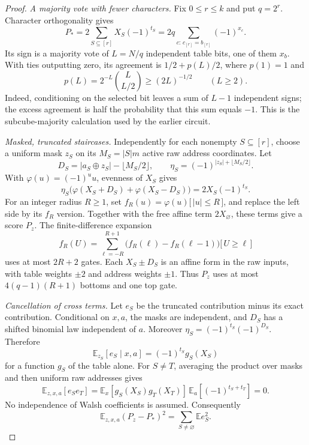 \documentclass[11pt,letterpaper]{article}
\theoremstyle{remark}
\newcommand{\ind}[1]{\bigl[\,#1\,\bigr]}
\begin{document}
\begin{proof}
\emph{A majority vote with fewer characters.}
Fix $0\le r\le k$ and put $q=2^r$. Character orthogonality gives
\[
P_*=2\sum_{S\subseteq[r]}X_S(-1)^{t_S}
 =2q\sum_{c:\,c_{[r]}=b_{[r]}}(-1)^{x_c}.
\]
Its sign is a majority vote of $L=N/q$ independent table bits, one of them
$x_b$. With ties outputting zero, its agreement is
$1/2+p(L)/2$, where $p(1)=1$ and
\[
p(L)=2^{-L}\binom{L}{L/2}\ge(2L)^{-1/2}\qquad(L\ge2).
\]
Indeed, conditioning on the selected bit leaves a sum of $L-1$ independent
signs; the excess agreement is half the probability that this sum equals
$-1$. This is the subcube-majority calculation used by the earlier circuit.

\emph{Masked, truncated staircases.}
Independently for each nonempty $S\subseteq[r]$, choose a uniform mask $z_S$
on its $M_S=|S|m$ active raw address coordinates. Let
\[
D_S=|a_S\oplus z_S|-\lfloor M_S/2\rfloor,\qquad
\eta_S=(-1)^{|z_S|+\lfloor M_S/2\rfloor}.
\]
With $\varphi(u)=(-1)^u u$, evenness of $X_S$ gives
\[
\eta_S\bigl(\varphi(X_S+D_S)+\varphi(X_S-D_S)\bigr)
 =2X_S(-1)^{t_S}.
\]
For an integer radius $R\ge1$, set
$f_R(u)=\varphi(u)\ind{|u|\le R}$, and replace the left side by its
$f_R$ version. Together with the free affine term $2X_\varnothing$, these
terms give a score $P_z$. The finite-difference expansion
\[
f_R(U)=\sum_{\ell=-R}^{R+1}
 \bigl(f_R(\ell)-f_R(\ell-1)\bigr)\ind{U\ge\ell}
\]
uses at most $2R+2$ gates. Each $X_S\pm D_S$ is an affine form in the raw
inputs, with table weights $\pm2$ and address weights $\pm1$.
Thus $P_z$ uses at most $4(q-1)(R+1)$ bottoms and one top gate.

\emph{Cancellation of cross terms.}
Let $e_S$ be the truncated contribution minus its exact contribution.
Conditional on $x,a$, the masks are independent, and
$D_S$ has a shifted binomial law independent of $a$. Moreover
$\eta_S=(-1)^{t_S}(-1)^{D_S}$. Therefore
\[
\mathbb E_{z_S}[e_S\mid x,a]=(-1)^{t_S}g_S(X_S)
\]
for a function $g_S$ of the table alone. For $S\ne T$, averaging the product
over masks and then uniform raw addresses gives
\[
\mathbb E_{z,x,a}[e_Se_T]
 =\mathbb E_x[g_S(X_S)g_T(X_T)]\,
   \mathbb E_a[(-1)^{t_S+t_T}]=0.
\]
No independence of Walsh coefficients is assumed. Consequently
\begin{equation}\label{eq:maskl2}
\mathbb E_{z,x,a}(P_z-P_*)^2=\sum_{S\ne\varnothing}\mathbb E e_S^2.
\end{equation}


\end{proof}
\end{document}
